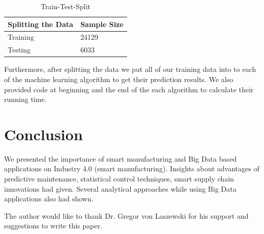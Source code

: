 \documentclass[sigconf]{acmart}
\begin{document}
\begin{table}[!ht]
\centering
\begin{tabular}{|l|l|}
\hline
\textbf{Splitting the Data} & \textbf{Sample Size} \\ \hline
Training                    & 24129                \\ \hline
Testing                     & 6033                 \\ \hline
\end{tabular}
\caption{Train-Test-Split}
\label{split}
\end{table}

\par Furthermore, after splitting the data we put all of our training data into to each of the machine learning algorithm to get their prediction results. We also provided code at beginning and the end of the each algorithm to calculate their running time.


\section{Conclusion}

We presented the importance of smart manufacturing and Big Data based applications on Industry 4.0 (smart manufacturing). Insights about advantages of predictive maintenance, statistical control techniques, smart supply chain innovations had given. Several analytical approaches while using Big Data applications also had shown.

\begin{acks}

The author would like to thank Dr. Gregor von Laszewski for his support and suggestions to write this paper.

\end{acks}


 
\end{document}

